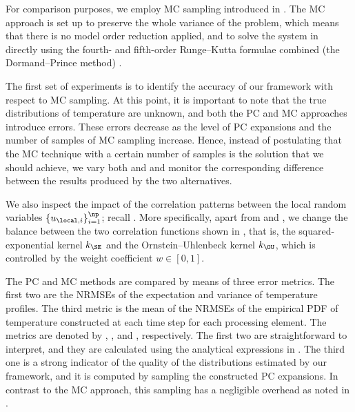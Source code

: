 For comparison purposes, we employ \ac{MC} sampling introduced in .
The \ac{MC} approach is set up to preserve the whole variance of the problem,
which means that there is no model order reduction applied, and to solve the
system in  directly using the fourth- and
fifth-order Runge--Kutta formulae combined (the Dormand--Prince method)
\cite{press2007}.


The first set of experiments is to identify the accuracy of our framework with
respect to \ac{MC} sampling. At this point, it is important to note that the
true distributions of temperature are unknown, and both the \ac{PC} and \ac{MC}
approaches introduce errors. These errors decrease as the level \lc of \ac{PC}
expansions and the number of samples \no of \ac{MC} sampling increase. Hence,
instead of postulating that the \ac{MC} technique with a certain number of
samples is the solution that we should achieve, we vary both \lc and \no and
monitor the corresponding difference between the results produced by the two
alternatives.

We also inspect the impact of the correlation patterns between the local random
variables $\{ u_{\local, i} \}_{i = 1}^\np$; recall
. More specifically, apart from \lc and \no,
we change the balance between the two correlation functions shown in
, that is, the squared-exponential kernel $k_\SE$
and the Ornstein--Uhlenbeck kernel $k_\OU$, which is controlled by the weight
coefficient $w \in [0, 1]$.

The \ac{PC} and \ac{MC} methods are compared by means of three error metrics.
The first two are the \acp{NRMSE} of the expectation and variance of temperature
profiles. The third metric is the mean of the \acp{NRMSE} of the empirical
\ac{PDF} of temperature constructed at each time step for each processing
element. The metrics are denoted by \error{\expectation}, \error{\variance}, and
, respectively. The first two are straightforward to interpret, and
they are calculated using the analytical expressions in .
The third one is a strong indicator of the quality of the distributions
estimated by our framework, and it is computed by sampling the constructed
\ac{PC} expansions. In contrast to the \ac{MC} approach, this sampling has a
negligible overhead as noted in .

